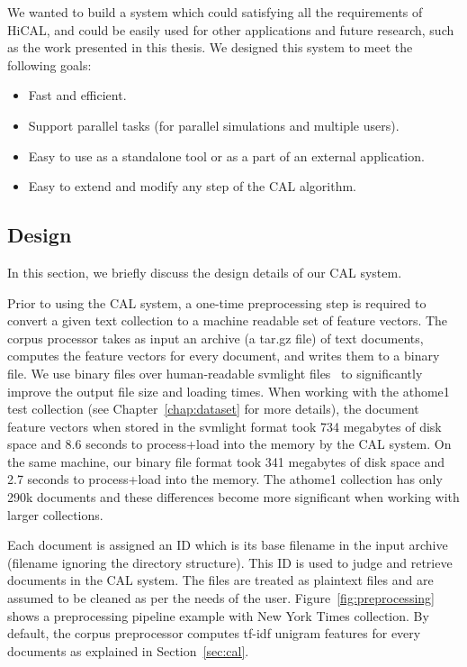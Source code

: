 We wanted to build a system which could satisfying all the requirements of
HiCAL, and could be easily used for other applications and future research, such as
the work presented in this thesis. We designed this system to meet the following
goals:

\begin{itemize}
\item Fast and efficient.
\item Support parallel tasks (for parallel simulations and multiple users).
\item Easy to use as a standalone tool or as a part of an external application.
\item Easy to extend and modify any step of the CAL algorithm.
\end{itemize}

\subsection{Design}
\label{sec:cal.design}
In this section, we briefly discuss the design details of our CAL system.

Prior to using the CAL system, a one-time preprocessing step is required to convert a
given text collection to a machine readable set of feature vectors. The corpus
processor takes as input an archive (a tar.gz file) of text documents, computes
the feature vectors for every document, and writes them to a binary file. We use
binary files over human-readable svmlight files~\cite{joachims1999svmlight} to
significantly improve the output file size and loading times. When working with
the athome1 test collection (see Chapter~\ref{chap:dataset} for more details),
the document feature vectors when stored in the svmlight format took 734
megabytes of disk space and 8.6 seconds to process+load into the memory by
the CAL system. On the same machine, our binary file format took 341 megabytes
of disk space and 2.7 seconds to process+load into the memory. The athome1
collection has only 290k documents and these differences become more significant
when working with larger collections.

Each document is assigned an ID which is its base
filename in the input archive (filename ignoring the directory structure). This
ID is used to judge and retrieve documents in the CAL system. The files are
treated as plaintext files and are assumed to be cleaned as per the needs of the
user.  Figure~\ref{fig:preprocessing} shows a preprocessing pipeline example
with New York Times collection.  By default, the corpus preprocessor computes
tf-idf unigram features for every documents as explained in Section~\ref{sec:cal}.

